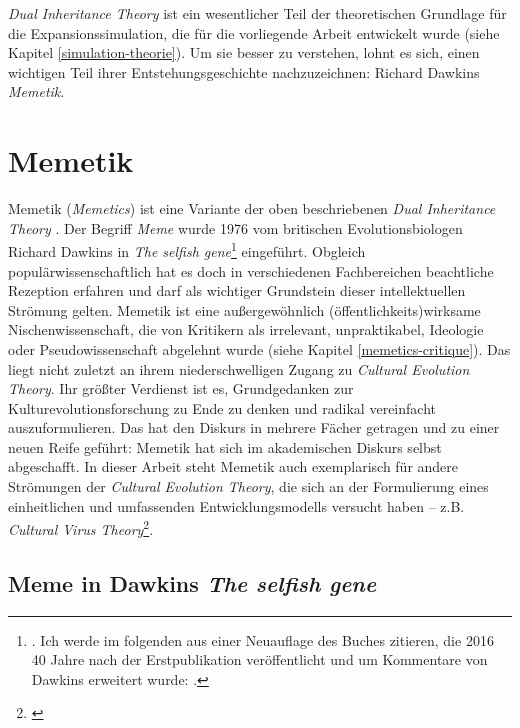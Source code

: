 \documentclass[openany,twoside,twocolumn]{book}
\let\rmarkdownfootnote\footnote%
\def\footnote{\protect\rmarkdownfootnote}
\begin{document}
\emph{Dual Inheritance Theory} ist ein wesentlicher Teil der theoretischen Grundlage für die Expansionssimulation, die für die vorliegende Arbeit entwickelt wurde (siehe Kapitel \ref{simulation-theorie}). Um sie besser zu verstehen, lohnt es sich, einen wichtigen Teil ihrer Entstehungsgeschichte nachzuzeichnen: Richard Dawkins \emph{Memetik}.

\hypertarget{memetics}{%
\section{Memetik}\label{memetics}}

Memetik (\emph{Memetics}) ist eine Variante der oben beschriebenen \emph{Dual Inheritance Theory} . Der Begriff \emph{Meme} wurde 1976 vom britischen Evolutionsbiologen Richard Dawkins in \emph{The selfish gene}\footnote{\textcite{Dawkinsselfishgene1976}. Ich werde im folgenden aus einer Neuauflage des Buches zitieren, die 2016 40 Jahre nach der Erstpublikation veröffentlicht und um Kommentare von Dawkins erweitert wurde: \textcite{Dawkinsselfishgene40th2016}.} eingeführt. Obgleich populärwissenschaftlich hat es doch in verschiedenen Fachbereichen beachtliche Rezeption erfahren und darf als wichtiger Grundstein dieser intellektuellen Strömung gelten. Memetik ist eine außergewöhnlich (öffentlichkeits)wirksame Nischenwissenschaft, die von Kritikern als irrelevant, unpraktikabel, Ideologie oder Pseudowissenschaft abgelehnt wurde (siehe Kapitel \ref{memetics-critique}). Das liegt nicht zuletzt an ihrem niederschwelligen Zugang zu \emph{Cultural Evolution Theory}. Ihr größter Verdienst ist es, Grundgedanken zur Kulturevolutionsforschung zu Ende zu denken und radikal vereinfacht auszuformulieren. Das hat den Diskurs in mehrere Fächer getragen und zu einer neuen Reife geführt: Memetik hat sich im akademischen Diskurs selbst abgeschafft. In dieser Arbeit steht Memetik auch exemplarisch für andere Strömungen der \emph{Cultural Evolution Theory}, die sich an der Formulierung eines einheitlichen und umfassenden Entwicklungsmodells versucht haben -- z.B. \emph{Cultural Virus Theory}\footnote{\textcite{cullen_contagious_2000}}.

\hypertarget{memetics-dawkins}{%
\subsection{\texorpdfstring{Meme in Dawkins \emph{The selfish gene}}{Meme in Dawkins The selfish gene}}\label{memetics-dawkins}}
\end{document}
